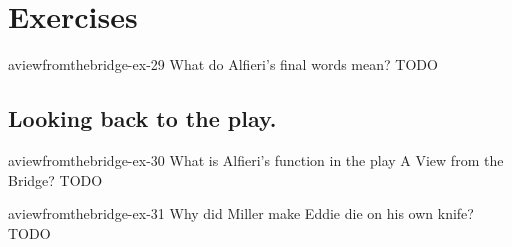 \documentclass[preview]{standalone}
\begin{document}
\genpage

\section{Exercises}

\begin{snippetexercise}{aviewfromthebridge-ex-29}
    {What do Alfieri's final words mean?}
    TODO
\end{snippetexercise}

\subsection{Looking back to the play.}

\begin{snippetexercise}{aviewfromthebridge-ex-30}
    {What is Alfieri's function in the play A View from the Bridge?}
    TODO
\end{snippetexercise}

\begin{snippetexercise}{aviewfromthebridge-ex-31}
    {Why did Miller make Eddie die on his own knife?}
    TODO
\end{snippetexercise}
\end{document}
